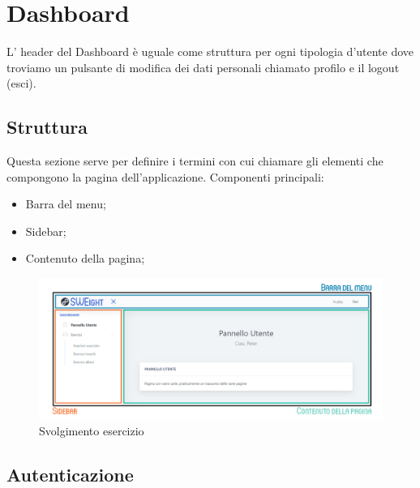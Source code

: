 \section{Dashboard}
L' header del Dashboard è uguale come struttura per ogni tipologia d'utente dove troviamo un pulsante di modifica dei dati 
personali chiamato profilo e il logout (esci).



\subsection{Struttura}
    Questa sezione serve per definire i termini con cui chiamare gli elementi che compongono la pagina dell'applicazione.
    Componenti principali:
    \begin{itemize}
        \item Barra del menu;
        \item {Sidebar};
        \item Contenuto della pagina;
    \end{itemize}

    \begin{figure}[H]
        \centering
        \includegraphics[width=17cm]{sez/img/istruzioni/dashboardMod.png} 
        \caption{Svolgimento esercizio}\label{fig:1}
    \end{figure}
\newpage

\subsection{Autenticazione}
